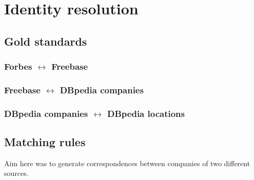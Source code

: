\section{Identity resolution}
\subsection{Gold standards}

\subsubsection{Forbes $\leftrightarrow$ Freebase}

\subsubsection{Freebase $\leftrightarrow$ DBpedia companies}

\subsubsection{DBpedia companies $\leftrightarrow$ DBpedia locations}


\subsection{Matching rules}
Aim here was to generate correspondences between companies of two different sources. 

